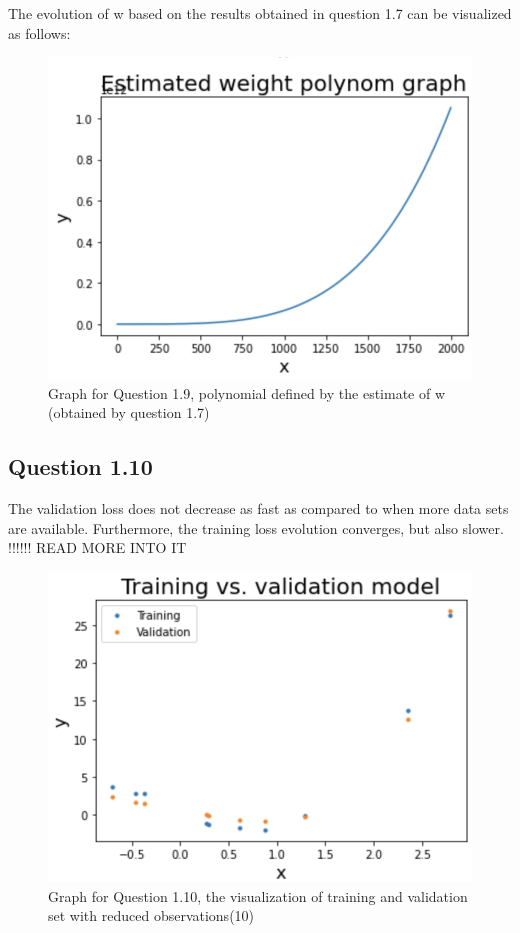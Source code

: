 \documentclass{article}
\begin{document}
The evolution of w based on the results obtained in question 1.7 can be visualized as follows:

\begin{figure}[!htb]
\centering
\includegraphics[scale = 0.8]{Question9_Graph.png}
\caption{\label{fig:fig}Graph for Question 1.9, polynomial defined by the estimate of w (obtained by question 1.7)}
\end{figure}


\subsection{Question 1.10}

The validation loss does not decrease as fast as compared to when more data sets are available. Furthermore, the training loss evolution converges, but also slower.
!!!!!! READ MORE INTO IT

\begin{figure}[!htb]
\centering
\includegraphics[scale = 0.8]{Question10_Graph1.png}
\caption{\label{fig:fig}Graph for Question 1.10, the visualization of training and validation set with reduced observations(10)}
\end{figure}
\end{document}
